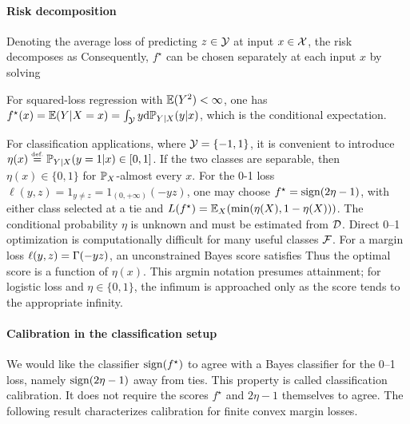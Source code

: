\paragraph{Risk decomposition}

Denoting 
the average loss of predicting $z\in\mathcal{Y}$ at input $x\in\mathcal{X}$, the risk decomposes as
Consequently, $f^\star$ can be chosen separately at each input $x$ by solving

\begin{exmp}[Regression]
For squared-loss regression with $\mathbb{E}(Y^2)<\infty$, one has $f^\star(x)=\mathbb{E}(Y|X=x) = \int_{\mathcal{Y}} y \mathrm{d} \mathbb{P}_{Y|X}(y|x)$, which is the conditional expectation.
\end{exmp}

\begin{exmp}[Classification]
For classification applications, where $\mathcal{Y} = \{-1,1\}$, it is convenient to introduce $\eta(x) \stackrel{\mbox{\upshape\tiny def.}}{=} \mathbb{P}_{Y|X}(y=1|x) \in [0,1]$.
%
If the two classes are separable, then $\eta(x) \in \{0,1\}$ for $\mathbb{P}_X$-almost every $x$.
%
For the 0-1 loss $\ell(y,z)=1_{y\neq z}=1_{(0,+\infty)}(-yz)$, one may choose $f^\star=\operatorname{sign}(2\eta-1)$, with either class selected at a tie and $L(f^\star) = \mathbb{E}_X( \min(\eta(X),1-\eta(X)) )$.
%
The conditional probability $\eta$ is unknown and must be estimated from $\mathcal{D}$. Direct 0--1 optimization is computationally difficult for many useful classes $\mathcal{F}$.
%
For a margin loss $\ell(y,z)=\Gamma(-yz)$, an unconstrained Bayes score satisfies
Thus the optimal score is a function of $\eta(x)$. This argmin notation presumes attainment; for logistic loss and $\eta\in\{0,1\}$, the infimum is approached only as the score tends to the appropriate infinity.
\end{exmp}

\paragraph{Calibration in the classification setup}

We would like the classifier $\operatorname{sign}(f^\star)$ to agree with a Bayes classifier for the 0--1 loss, namely $\operatorname{sign}(2\eta-1)$ away from ties. This property is called classification calibration. It does not require the scores $f^\star$ and $2\eta-1$ themselves to agree. The following result characterizes calibration for finite convex margin losses.

